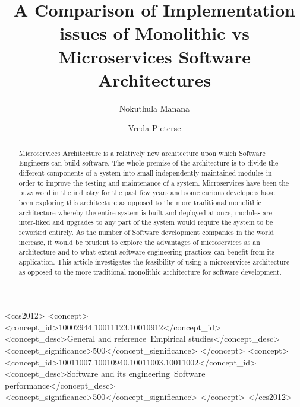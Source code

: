 \documentclass[sigconf]{acmart}
\begin{document}
\title{A Comparison of Implementation issues of Monolithic vs Microservices Software Architectures}

\author{Nokuthula Manana}

\author{Vreda Pieterse}



\begin{abstract}
Microservices Architecture is a relatively new architecture upon which Software Engineers can build software. The whole premise of the architecture is to divide the different components of a system into small independently maintained modules in order to improve the testing and maintenance of a system. Microservices have been the buzz word in the industry for the past few years and some curious developers have been exploring this architecture as opposed to the more traditional monolithic architecture whereby the entire system is built and deployed at once, modules are inter-liked and upgrades to any part of the system would require the system to be reworked entirely. As the number of Software development companies in the world increase, it would be prudent to explore the advantages of microservices as an architecture and to what extent software engineering practices can benefit from its application. This article investigates the feasibility of using a microservices architecture as opposed to the more traditional monolithic architecture for software development.
\end{abstract}

%
%
\begin{CCSXML}
<ccs2012>
<concept>
<concept_id>10002944.10011123.10010912</concept_id>
<concept_desc>General and reference~Empirical studies</concept_desc>
<concept_significance>500</concept_significance>
</concept>
<concept>
<concept_id>10011007.10010940.10011003.10011002</concept_id>
<concept_desc>Software and its engineering~Software performance</concept_desc>
<concept_significance>500</concept_significance>
</concept>
</ccs2012>
\end{CCSXML}
\end{document}
